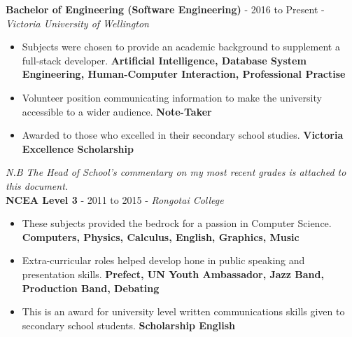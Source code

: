 \documentclass[9pt]{developercv}
\begin{document}


\textbf{Bachelor of Engineering (Software Engineering)} - 2016 to Present - \emph{Victoria University of Wellington}
\begin{itemize}
	\item Subjects were chosen to provide an academic background to supplement a full-stack developer. \textbf{Artificial Intelligence, Database System Engineering, Human-Computer Interaction, Professional Practise}
	\item Volunteer position communicating information to make the university accessible to a wider audience. \textbf{Note-Taker}
	\item Awarded to those who excelled in their secondary school studies. \textbf{Victoria Excellence Scholarship}
\end{itemize}
\emph{N.B The Head of School's commentary on my most recent grades is attached to this document.} \\

\textbf{NCEA Level 3} - 2011 to 2015 - \emph{Rongotai College}
\begin{itemize}
	\item These subjects provided the bedrock for a passion in Computer Science. \textbf{Computers, Physics, Calculus, English, Graphics, Music}
	\item Extra-curricular roles helped develop hone in public speaking and presentation skills. \textbf{Prefect, UN Youth Ambassador, Jazz Band, Production Band, Debating}
	\item This is an award for university level written communications skills given to secondary school students. \textbf{Scholarship English}
\end{itemize}

\end{document}
